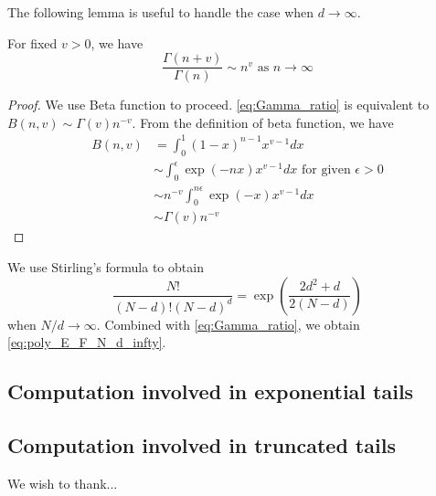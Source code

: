 \documentclass{aptpub}
\begin{document}
The following lemma is useful to handle the case when $d\to \infty$.
\begin{lemma}
     For fixed $v>0$, we have
     \begin{equation}\label{eq:Gamma_ratio}
         \frac{\Gamma(n+v)}{\Gamma(n)} \sim
         n^v
         \textrm{ as } n \to \infty             
     \end{equation}
 \end{lemma}
 \begin{proof}
     We use Beta function to proceed.
     \eqref{eq:Gamma_ratio} is equivalent to
     $B(n, v) \sim \Gamma(v) n^{-v}$.
     From the definition of beta function,
     we have
     \begin{align*}
         B(n,v) &=\int_0^1 (1-x)^{n-1} x^{v-1} dx \\
         &\sim \int_0^{\epsilon} \exp(-nx) x^{v-1}dx \textrm{ for given } \epsilon>0\\
         & \sim n^{-v} \int_0^{n\epsilon} \exp(-x)x^{v-1}dx\\
         &\sim \Gamma(v) n^{-v}
     \end{align*}
 \end{proof}
We use Stirling's formula to 
obtain
\begin{equation}
     \frac{N!}{(N-d)! (N-d)^d}
     = \exp
     \left(\frac{2d^2+d}{2(N-d)} \right)  
\end{equation}
when $N/d\to \infty$.
Combined with \eqref{eq:Gamma_ratio}, we obtain \eqref{eq:poly_E_F_N_d_infty}.
\subsection{Computation involved in exponential tails}
\subsection{Computation involved in truncated tails}



\acks %
\noindent We wish to thank...
\end{document}
